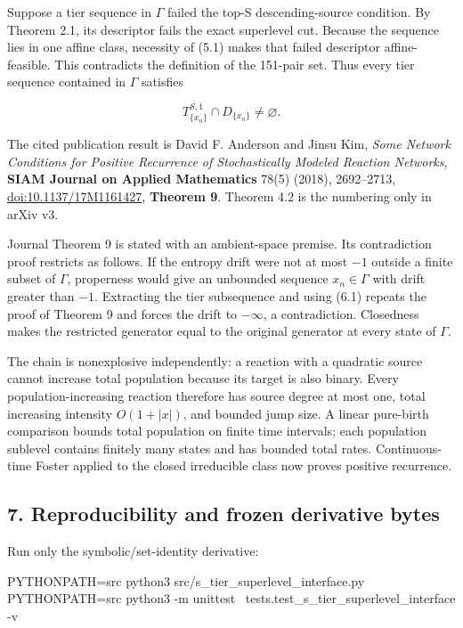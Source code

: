 Suppose a tier sequence in \(\Gamma\) failed the top-S descending-source
condition. By Theorem 2.1, its descriptor fails the exact superlevel
cut. Because the sequence lies in one affine class, necessity of (5.1)
makes that failed descriptor affine-feasible. This contradicts the
definition of the 151-pair set. Thus every tier sequence contained in
\(\Gamma\) satisfies

\[
 T^{S,1}_{\{x_n\}}\cap D_{\{x_n\}}\ne\varnothing.
 \tag{6.1}
\]

The cited publication result is David F. Anderson and Jinsu Kim,
\emph{Some Network Conditions for Positive Recurrence of Stochastically
Modeled Reaction Networks}, \textbf{SIAM Journal on Applied Mathematics}
78(5) (2018), 2692--2713,
\href{https://doi.org/10.1137/17M1161427}{doi:10.1137/17M1161427},
\textbf{Theorem 9}. Theorem 4.2 is the numbering only in arXiv v3.

Journal Theorem 9 is stated with an ambient-space premise. Its
contradiction proof restricts as follows. If the entropy drift were not
at most \(-1\) outside a finite subset of \(\Gamma\), properness would
give an unbounded sequence \(x_n\in\Gamma\) with drift greater than
\(-1\). Extracting the tier subsequence and using (6.1) repeats the
proof of Theorem 9 and forces the drift to \(-\infty\), a contradiction.
Closedness makes the restricted generator equal to the original
generator at every state of \(\Gamma\).

The chain is nonexplosive independently: a reaction with a quadratic
source cannot increase total population because its target is also
binary. Every population-increasing reaction therefore has source degree
at most one, total increasing intensity \(O(1+|x|)\), and bounded jump
size. A linear pure-birth comparison bounds total population on finite
time intervals; each population sublevel contains finitely many states
and has bounded total rates. Continuous-time Foster applied to the
closed irreducible class now proves positive recurrence.

\subsection{7. Reproducibility and frozen derivative
bytes}

Run only the symbolic/set-identity derivative:

\begin{CodeBlock}
PYTHONPATH=src python3 src/s_tier_superlevel_interface.py
PYTHONPATH=src python3 -m unittest \
  tests.test_s_tier_superlevel_interface -v
\end{CodeBlock}

